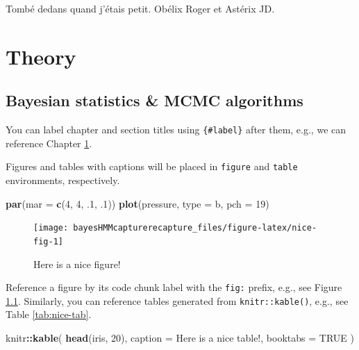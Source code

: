 \documentclass[
  12pt,
]{krantz}
\newenvironment{Shaded}{\begin{snugshade}}{\end{snugshade}}
\newcommand{\DataTypeTok}[1]{\textcolor[rgb]{0.13,0.29,0.53}{#1}}
\newcommand{\DecValTok}[1]{\textcolor[rgb]{0.00,0.00,0.81}{#1}}
\newcommand{\FloatTok}[1]{\textcolor[rgb]{0.00,0.00,0.81}{#1}}
\newcommand{\KeywordTok}[1]{\textcolor[rgb]{0.13,0.29,0.53}{\textbf{#1}}}
\newcommand{\NormalTok}[1]{#1}
\newcommand{\OperatorTok}[1]{\textcolor[rgb]{0.81,0.36,0.00}{\textbf{#1}}}
\newcommand{\OtherTok}[1]{\textcolor[rgb]{0.56,0.35,0.01}{#1}}
\newcommand{\StringTok}[1]{\textcolor[rgb]{0.31,0.60,0.02}{#1}}
\begin{document}
Tombé dedans quand j'étais petit. Obélix Roger et Astérix JD.

\mainmatter

\hypertarget{part-theory}{%
\part{Theory}\label{part-theory}}

\hypertarget{crashcourse}{%
\chapter{Bayesian statistics \& MCMC algorithms}\label{crashcourse}}

You can label chapter and section titles using \texttt{\{\#label\}} after them, e.g., we can reference Chapter \ref{crashcourse}.

Figures and tables with captions will be placed in \texttt{figure} and \texttt{table} environments, respectively.

\begin{Shaded}
\begin{Highlighting}[]
\KeywordTok{par}\NormalTok{(}\DataTypeTok{mar =} \KeywordTok{c}\NormalTok{(}\DecValTok{4}\NormalTok{, }\DecValTok{4}\NormalTok{, }\FloatTok{.1}\NormalTok{, }\FloatTok{.1}\NormalTok{))}
\KeywordTok{plot}\NormalTok{(pressure, }\DataTypeTok{type =} \StringTok{\textquotesingle{}b\textquotesingle{}}\NormalTok{, }\DataTypeTok{pch =} \DecValTok{19}\NormalTok{)}
\end{Highlighting}
\end{Shaded}

\begin{figure}

{\centering \texttt{[image: bayesHMMcapturerecapture\_files/figure-latex/nice-fig-1]} 

}

\caption{Here is a nice figure!}\label{fig:nice-fig}
\end{figure}

Reference a figure by its code chunk label with the \texttt{fig:} prefix, e.g., see Figure \ref{fig:nice-fig}. Similarly, you can reference tables generated from \texttt{knitr::kable()}, e.g., see Table \ref{tab:nice-tab}.

\begin{Shaded}
\begin{Highlighting}[]
\NormalTok{knitr}\OperatorTok{::}\KeywordTok{kable}\NormalTok{(}
  \KeywordTok{head}\NormalTok{(iris, }\DecValTok{20}\NormalTok{), }\DataTypeTok{caption =} \StringTok{\textquotesingle{}Here is a nice table!\textquotesingle{}}\NormalTok{,}
  \DataTypeTok{booktabs =} \OtherTok{TRUE}
\NormalTok{)}
\end{Highlighting}
\end{Shaded}
\end{document}
